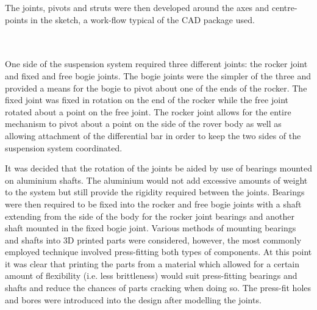       The joints, pivots and struts were then developed around the axes and centre-points in the sketch, a work-flow typical of the CAD package used.
      
      \\\\
        One side of the suspension system required three different joints: the rocker joint and fixed and free bogie joints. The bogie joints were the simpler of the three and provided a means for the bogie to pivot about one of the ends of the rocker. The fixed joint was fixed in rotation on the end of the rocker while the free joint rotated about a point on the free joint. The rocker joint allows for the entire mechanism to pivot about a point on the side of the rover body as well as allowing attachment of the differential bar in order to keep the two sides of the suspension system coordinated.
        
        It was decided that the rotation of the joints be aided by use of bearings mounted on aluminium shafts. The aluminium would not add excessive amounts of weight to the system but still provide the rigidity required between the joints. Bearings were then required to be fixed into the rocker and free bogie joints with a shaft extending from the side of the body for the rocker joint bearings and another shaft mounted in the fixed bogie joint. Various methods of mounting bearings and shafts into 3D printed parts were considered, however, the most commonly employed technique involved press-fitting both types of components. At this point it was clear that printing the parts from a material which allowed for a certain amount of flexibility (i.e. less brittleness) would suit press-fitting bearings and shafts and reduce the chances of parts cracking when doing so. The press-fit holes and bores were introduced into the design after modelling the joints.
        
